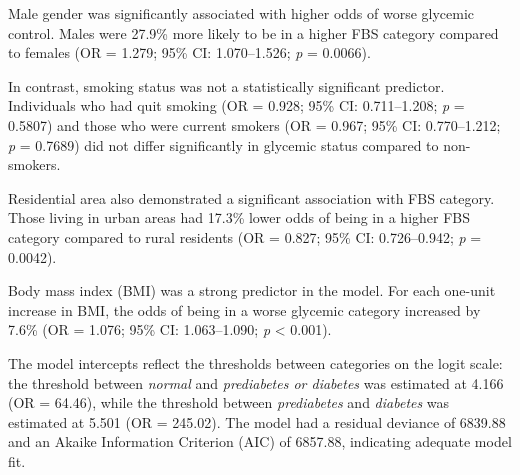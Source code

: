 \documentclass[
  letterpaper,
  DIV=11,
  numbers=noendperiod]{scrartcl}
\begin{document}
Male gender was significantly associated with higher odds of worse
glycemic control. Males were 27.9\% more likely to be in a higher FBS
category compared to females (OR = 1.279; 95\% CI: 1.070--1.526;
\emph{p} = 0.0066).

In contrast, smoking status was not a statistically significant
predictor. Individuals who had quit smoking (OR = 0.928; 95\% CI:
0.711--1.208; \emph{p} = 0.5807) and those who were current smokers (OR
= 0.967; 95\% CI: 0.770--1.212; \emph{p} = 0.7689) did not differ
significantly in glycemic status compared to non-smokers.

Residential area also demonstrated a significant association with FBS
category. Those living in urban areas had 17.3\% lower odds of being in
a higher FBS category compared to rural residents (OR = 0.827; 95\% CI:
0.726--0.942; \emph{p} = 0.0042).

Body mass index (BMI) was a strong predictor in the model. For each
one-unit increase in BMI, the odds of being in a worse glycemic category
increased by 7.6\% (OR = 1.076; 95\% CI: 1.063--1.090; \emph{p}
\textless{} 0.001).

The model intercepts reflect the thresholds between categories on the
logit scale: the threshold between \emph{normal} and \emph{prediabetes
or diabetes} was estimated at 4.166 (OR = 64.46), while the threshold
between \emph{prediabetes} and \emph{diabetes} was estimated at 5.501
(OR = 245.02). The model had a residual deviance of 6839.88 and an
Akaike Information Criterion (AIC) of 6857.88, indicating adequate model
fit.
\end{document}
